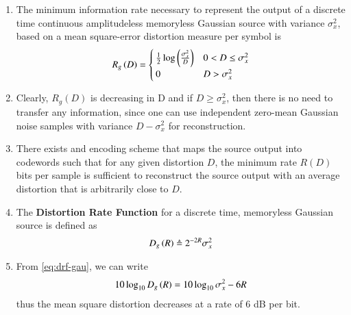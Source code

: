 \documentclass[journal,12pt,twocolumn]{IEEEtran}
\renewcommand\thesection{\arabic{section}}
\begin{document}
\begin{enumerate}[label=\thesection.\arabic*, ref=\thesection.\theenumi]
\begin{enumerate}
\begin{proof}
            as desired.
        \end{proof}
        \item $R(0) \le H(X)$
        \begin{proof}
            Setting $\hat{X} = X$, we get $d(X, \hat{X}) = 0$ and so 
            $R(0) \le H(X)$.
        \end{proof}
        \item $R(D) = 0$ for $D \ge D_{\textrm{max}}$.
        \begin{proof}
            Since $I(X;\hat{X}) \ge 0$, we see that $R(D) \ge 0$ for all $D$.
            However, $R\brak{D_{\textrm{max}}} = 0$. Thus, since $R(D)$ is 
            non-increasing, the conclusion follows.
        \end{proof}
    \end{enumerate}
    \item The minimum information rate necessary to represent the output of a
    discrete time continuous amplitudeless memoryless Gaussian source with
    variance $\sigma_x^2$, based on a mean square-error distortion measure per 
    symbol is
    \begin{align}
        R_g\left(D\right) =
        \begin{cases}
            \frac{1}{2}\log\left(\frac{\sigma_x^2}{D}\right) & 0 < D \le \sigma_x^2 \\
            0 & D > \sigma_x^2
        \end{cases}
        \label{eq:dist-gau}
    \end{align}
    \item Clearly, $R_g(D)$ is decreasing in D and if $D \ge \sigma_x^2$, then 
    there is no need to transfer any information, since one can use independent 
    zero-mean Gaussian noise samples with variance $D-\sigma_x^2$ for 
    reconstruction.
    \item There exists and encoding scheme that maps the source output into
    codewords such that for any given distortion $D$, the minimum rate $R(D)$
    bits per sample is sufficient to reconstruct the source output with an 
    average distortion that is arbitrarily close to $D$.
    \item The \textbf{Distortion Rate Function} for a discrete time, memoryless 
    Gaussian source is defined as
    \begin{align}
        D_g\left(R\right) \triangleq 2^{-2R}\sigma_x^2
        \label{eq:drf-gau}
    \end{align}
    \item From \eqref{eq:drf-gau}, we can write
    \begin{align}
        10\log_{10}D_g\left(R\right) = 10\log_{10}\sigma_x^2 - 6R
    \end{align}
    thus the mean square distortion decreases at a rate of 6 dB per bit.
\end{enumerate}
\end{document}
